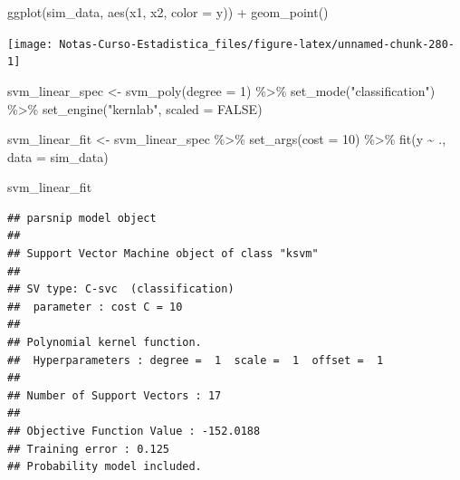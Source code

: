 \documentclass[
  12pt,
]{book}
\newenvironment{Shaded}{\begin{snugshade}}{\end{snugshade}}
\newcommand{\AttributeTok}[1]{\textcolor[rgb]{0.77,0.63,0.00}{#1}}
\newcommand{\ConstantTok}[1]{\textcolor[rgb]{0.00,0.00,0.00}{#1}}
\newcommand{\DecValTok}[1]{\textcolor[rgb]{0.00,0.00,0.81}{#1}}
\newcommand{\FunctionTok}[1]{\textcolor[rgb]{0.00,0.00,0.00}{#1}}
\newcommand{\NormalTok}[1]{#1}
\newcommand{\OtherTok}[1]{\textcolor[rgb]{0.56,0.35,0.01}{#1}}
\newcommand{\SpecialCharTok}[1]{\textcolor[rgb]{0.00,0.00,0.00}{#1}}
\newcommand{\StringTok}[1]{\textcolor[rgb]{0.31,0.60,0.02}{#1}}
\theoremstyle{definition}
\theoremstyle{definition}
\theoremstyle{definition}
\theoremstyle{definition}
\theoremstyle{remark}
\begin{document}
\begin{Shaded}
\begin{Highlighting}[]
\FunctionTok{ggplot}\NormalTok{(sim\_data, }\FunctionTok{aes}\NormalTok{(x1, x2, }\AttributeTok{color =}\NormalTok{ y)) }\SpecialCharTok{+} \FunctionTok{geom\_point}\NormalTok{()}
\end{Highlighting}
\end{Shaded}

\begin{center}\texttt{[image: Notas-Curso-Estadistica\_files/figure-latex/unnamed-chunk-280-1]} \end{center}

\begin{Shaded}
\begin{Highlighting}[]
\NormalTok{svm\_linear\_spec }\OtherTok{\textless{}{-}} \FunctionTok{svm\_poly}\NormalTok{(}\AttributeTok{degree =} \DecValTok{1}\NormalTok{) }\SpecialCharTok{\%\textgreater{}\%}
    \FunctionTok{set\_mode}\NormalTok{(}\StringTok{"classification"}\NormalTok{) }\SpecialCharTok{\%\textgreater{}\%}
    \FunctionTok{set\_engine}\NormalTok{(}\StringTok{"kernlab"}\NormalTok{, }\AttributeTok{scaled =} \ConstantTok{FALSE}\NormalTok{)}
\end{Highlighting}
\end{Shaded}

\begin{Shaded}
\begin{Highlighting}[]
\NormalTok{svm\_linear\_fit }\OtherTok{\textless{}{-}}\NormalTok{ svm\_linear\_spec }\SpecialCharTok{\%\textgreater{}\%}
    \FunctionTok{set\_args}\NormalTok{(}\AttributeTok{cost =} \DecValTok{10}\NormalTok{) }\SpecialCharTok{\%\textgreater{}\%}
    \FunctionTok{fit}\NormalTok{(y }\SpecialCharTok{\textasciitilde{}}\NormalTok{ ., }\AttributeTok{data =}\NormalTok{ sim\_data)}

\NormalTok{svm\_linear\_fit}
\end{Highlighting}
\end{Shaded}

\begin{verbatim}
## parsnip model object
## 
## Support Vector Machine object of class "ksvm" 
## 
## SV type: C-svc  (classification) 
##  parameter : cost C = 10 
## 
## Polynomial kernel function. 
##  Hyperparameters : degree =  1  scale =  1  offset =  1 
## 
## Number of Support Vectors : 17 
## 
## Objective Function Value : -152.0188 
## Training error : 0.125 
## Probability model included.
\end{verbatim}
\end{document}

